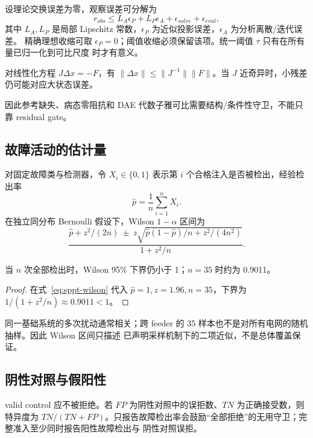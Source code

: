 设理论交换误差为零，观察误差可分解为
\begin{equation}
 r_{obs}\le L_A\epsilon_P+L_P\epsilon_A+\epsilon_{solve}+\epsilon_{eval},
 \label{eq:sppt-error-budget}
\end{equation}
其中 $L_A,L_P$ 是局部 Lipschitz 常数，$\epsilon_P$ 为近似投影误差，$\epsilon_A$ 为分析离散/迭代误差。
精确理想收缩可取 $\epsilon_P=0$；阈值收缩必须保留该项。统一阈值 $\tau$ 只有在所有量已归一化到可比尺度
时才有意义。

\begin{proposition}[残差小不推出前向误差小]
对线性化方程 $J\Delta x=-F$，有
$\|\Delta x\|\le\|J^{-1}\|\|F\|$。当 $J$ 近奇异时，小残差仍可能对应大状态误差。
\end{proposition}
因此参考缺失、病态零阻抗和 DAE 代数子雅可比需要结构/条件性守卫，不能只靠 residual gate。

\subsection{故障活动的估计量}

对固定故障类与检测器，令 $X_i\in\{0,1\}$ 表示第 $i$ 个合格注入是否被检出，经验检出率
\begin{equation}
 \hat p=\frac1n\sum_{i=1}^nX_i.
\end{equation}
在独立同分布 Bernoulli 假设下，Wilson $1-\alpha$ 区间为
\begin{equation}
 \frac{\hat p+z^2/(2n)\ \pm\ z
 \sqrt{\hat p(1-\hat p)/n+z^2/(4n^2)}}{1+z^2/n}.
 \label{eq:sppt-wilson}
\end{equation}

\begin{proposition}[全检出不等于 $p=1$]
当 $n$ 次全部检出时，Wilson 95\% 下界仍小于 1；$n=35$ 时约为 0.9011。
\end{proposition}
\begin{proof}
在式~\eqref{eq:sppt-wilson} 代入 $\hat p=1,z=1.96,n=35$，下界为
$1/(1+z^2/n)\approx0.9011<1$。
\end{proof}

同一基础系统的多次扰动通常相关；跨 feeder 的 35 样本也不是对所有电网的随机抽样。因此 Wilson 区间只描述
已声明采样机制下的二项近似，不是总体覆盖保证。

\subsection{阴性对照与假阳性}

valid control 应不被拒绝。若 $FP$ 为阴性对照中的误拒数、$TN$ 为正确接受数，则特异度为
$TN/(TN+FP)$。只报告故障检出率会鼓励“全部拒绝”的无用守卫；完整准入至少同时报告阳性故障检出与
阴性对照误拒。

